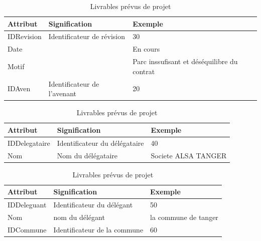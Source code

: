\documentclass[a4paper]{report}
\begin{document}
\begin{doublespace}
	\begin{table}[H]
		\begin{center}
			\begin{tabularx}{17cm}{|X|X|X|}
				\hline
				\textbf{Attribut} & \textbf{Signification}      &
				\textbf{Exemple}                                                                              \\
				\hline
				IDRevision        & Identificateur de révision  & 30                                          \\
				\hline
				Date              &                             & En cours                                    \\
				\hline
				Motif             &                             & Parc inssufisant et déséquilibre du contrat \\
				\hline
				IDAven            & Identificateur de l'avenant & 20                                          \\
				\hline
			\end{tabularx}
			\caption{Livrables prévus de projet}
		\end{center}
	\end{table}
	
	\begin{table}[H]
		\begin{center}
			\begin{tabularx}{17.5cm}{|X|X|X|}
				\hline
				\textbf{Attribut} & \textbf{Signification}        &
				\textbf{Exemple}                                                        \\
				\hline
				IDDelegataire     & Identificateur du délégataire & 40                  \\
				\hline
				Nom               & Nom du délégataire            & Societe ALSA TANGER \\
				\hline
			\end{tabularx}
			\caption{Livrables prévus de projet}
		\end{center}
	\end{table}
	
	\begin{table}[H]
		\begin{center}
			\begin{tabularx}{17.5cm}{|X|X|X|}
				\hline
				\textbf{Attribut} & \textbf{Signification}       &
				\textbf{Exemple}                                                        \\
				\hline
				IDDeleguant       & Identificateur du délégant   & 50                   \\
				\hline
				Nom               & nom du délégant              & la commune de tanger \\
				\hline
				IDCommune         & Identificateur de la commune & 60                   \\
				\hline
			\end{tabularx}
			\caption{Livrables prévus de projet}
		\end{center}
	\end{table}
	

\end{doublespace}
\end{document}
